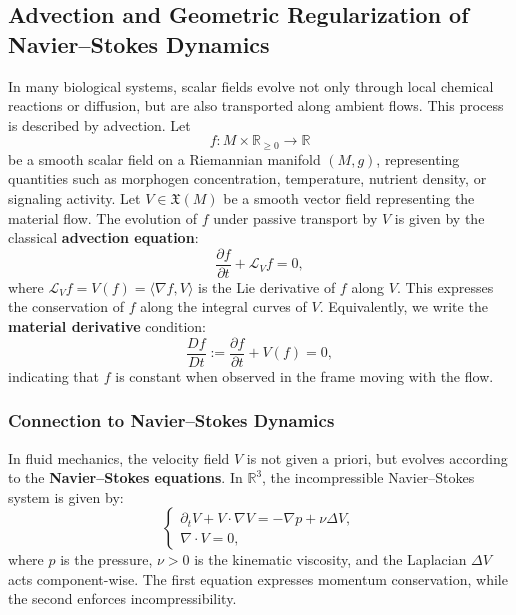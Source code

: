 \subsection{Advection and Geometric Regularization of Navier--Stokes Dynamics}
\label{subsec:advection_navierstokes}

In many biological systems, scalar fields evolve not only through local chemical reactions or diffusion, but are also transported along ambient flows. This process is described by advection. Let
\[
f : M \times \mathbb{R}_{\geq 0} \to \mathbb{R}
\]
be a smooth scalar field on a Riemannian manifold $(M, g)$, representing quantities such as morphogen concentration, temperature, nutrient density, or signaling activity. Let $V \in \mathfrak{X}(M)$ be a smooth vector field representing the material flow. The evolution of $f$ under passive transport by $V$ is given by the classical \textbf{advection equation}:
\begin{equation}
\label{eq:advection_equation}
\frac{\partial f}{\partial t} + \mathcal{L}_V f = 0,
\end{equation}
where $\mathcal{L}_V f = V(f) = \langle \nabla f, V \rangle$ is the Lie derivative of $f$ along $V$. This expresses the conservation of $f$ along the integral curves of $V$. Equivalently, we write the \textbf{material derivative} condition:
\begin{equation}
\label{eq:material_derivative}
\frac{D f}{D t} := \frac{\partial f}{\partial t} + V(f) = 0,
\end{equation}
indicating that $f$ is constant when observed in the frame moving with the flow.

\subsubsection{Connection to Navier--Stokes Dynamics} In fluid mechanics, the velocity field $V$ is not given a priori, but evolves according to the \textbf{Navier--Stokes equations}. In $\mathbb{R}^3$, the incompressible Navier--Stokes system is given by:
\begin{equation}
\label{eq:navier_stokes}
\begin{cases}
\partial_t V + V \cdot \nabla V = -\nabla p + \nu \Delta V, \\
\nabla \cdot V = 0,
\end{cases}
\end{equation}
where $p$ is the pressure, $\nu > 0$ is the kinematic viscosity, and the Laplacian $\Delta V$ acts component-wise. The first equation expresses momentum conservation, while the second enforces incompressibility.

